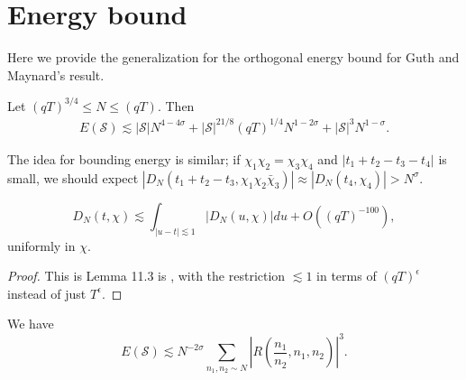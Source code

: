
\section{Energy bound}
Here we provide the generalization for the orthogonal energy bound for Guth and Maynard's result. 
\begin{proposition}\label{energybound}
    Let $(qT)^{3/4}\leq N\leq (qT)$. Then
    \begin{align*}
E(\mathcal{S})\lesssim |\mathcal{S}|N^{4-4\sigma}+|\mathcal{S}|^{21/8}(qT)^{1/4}N^{1-2\sigma}+|\mathcal{S}|^3N^{1-\sigma}.
    \end{align*}
\end{proposition}
The idea for bounding energy is similar; if $\chi_1\chi_2=\chi_3\chi_4$ and $|t_1+t_2-t_3-t_4|$ is small, we should expect $|D_N(t_1+t_2-t_3,\chi_1\chi_2\bar{\chi}_3)|\approx |D_N(t_4,\chi_4)|>N^\sigma$.
\begin{lemma}
    \label{Dirichletint}
    \[
    D_N(t,\chi)\lesssim \int_{|u-t|\lesssim 1} |D_N(u,\chi)|du + O((qT)^{-100}),
    \]
    uniformly in $\chi$.
\end{lemma}
\begin{proof}
    This is Lemma 11.3 is \cite{GM2024}, with the restriction $\lesssim 1$ in terms of $(qT)^{\epsilon}$ instead of just $T^{\epsilon}$.
\end{proof}
\begin{lemma} We have \[
    E(\mathcal{S})\lesssim N^{-2\sigma}\sum_{n_1,n_2\sim N}\left|R\left(\frac{n_1}{n_2},n_1,n_2\right) \right|^3.
    \]
    
\end{lemma}
